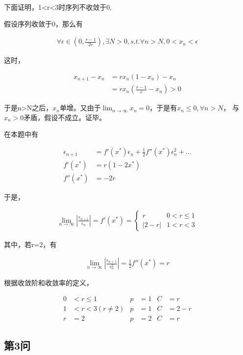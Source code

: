 \documentclass[10pt, a4paper]{article}
\begin{document}
    下面证明，1<r<3时序列不收敛于0.
    
    假设序列收敛于0，那么有

    \begin{align}
        \forall \epsilon \in (0,\frac{r-1}{2r}),\exists N>0,s.t.\forall n>N,0<x_n<\epsilon 
    \end{align}

    这时，
    
    \begin{align}
        x_{n+1}-x_n&=rx_n(1-x_n)-x_n\\
        &=rx_n(\frac{r-1}{r}-x_n)>0
    \end{align}

    于是n>N之后，{$x_n$}单增。又由于$ \lim_{n \to \infty} x_n=0 $，于是有$x_n\le0,\forall n>N$，
    与$x_n>0$矛盾，假设不成立。证毕。

    在本题中有

    \begin{align}
        \epsilon_{n+1}&=f'(x^*)\epsilon_n+\frac{1}{2}f''(x^*)\epsilon_n^2+\dots\\
        f'(x^*)&=r(1-2x^*)\\
        f''(x^*)&=-2r
    \end{align}

    于是，

    \begin{align}
        \lim_{n \to \infty} |\frac{\epsilon_{n+1}}{\epsilon_n}|=f'(x^*)=
        \begin{cases}
            r& 0<r\le1\\
            |2-r|&1<r<3
        \end{cases} 
    \end{align}

    其中，若r=2，有

    \begin{align}
        \lim_{n \to \infty} |\frac{\epsilon_{n+1}}{\epsilon_n^2}|=\frac{1}{2}f''(x^*)=r
    \end{align}

    根据收敛阶和收敛率的定义，

    \begin{align}
        0&<r\le1 & p&=1 & C&=r\\
        1&<r<3(r\neq 2)  & p&=1 & C&=2-r\\
        r&=2 & p&=2 & C&=r
    \end{align}

    \subsection{第3问}
\end{document}
